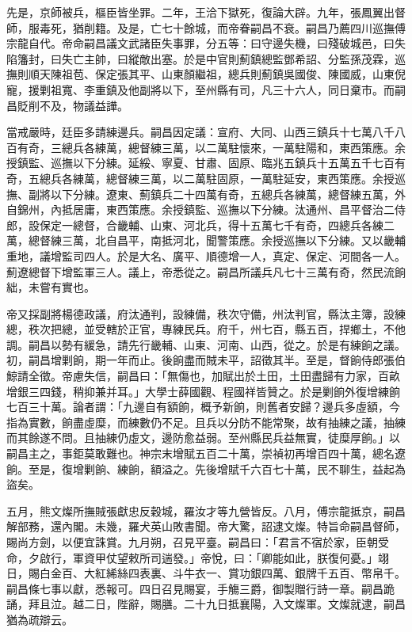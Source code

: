 \begin{pinyinscope}
先是，京師被兵，樞臣皆坐罪。二年，王洽下獄死，復論大辟。九年，張鳳翼出督師，服毒死，猶削籍。及是，亡七十餘城，而帝眷嗣昌不衰。嗣昌乃薦四川巡撫傅宗龍自代。帝命嗣昌議文武諸臣失事罪，分五等：曰守邊失機，曰殘破城邑，曰失陷籓封，曰失亡主帥，曰縱敵出塞。於是中官則薊鎮總監鄧希詔、分監孫茂霖，巡撫則順天陳祖苞、保定張其平、山東顏繼祖，總兵則薊鎮吳國俊、陳國威，山東倪寵，援剿祖寬、李重鎮及他副將以下，至州縣有司，凡三十六人，同日棄市。而嗣昌貶削不及，物議益譁。

當戒嚴時，廷臣多請練邊兵。嗣昌因定議：宣府、大同、山西三鎮兵十七萬八千八百有奇，三總兵各練萬，總督練三萬，以二萬駐懷來，一萬駐陽和，東西策應。余授鎮監、巡撫以下分練。延綏、寧夏、甘肅、固原、臨兆五鎮兵十五萬五千七百有奇，五總兵各練萬，總督練三萬，以二萬駐固原，一萬駐延安，東西策應。余授巡撫、副將以下分練。遼東、薊鎮兵二十四萬有奇，五總兵各練萬，總督練五萬，外自錦州，內抵居庸，東西策應。余授鎮監、巡撫以下分練。汰通州、昌平督治二侍郎，設保定一總督，合畿輔、山東、河北兵，得十五萬七千有奇，四總兵各練二萬，總督練三萬，北自昌平，南抵河北，聞警策應。余授巡撫以下分練。又以畿輔重地，議增監司四人。於是大名、廣平、順德增一人，真定、保定、河間各一人。薊遼總督下增監軍三人。議上，帝悉從之。嗣昌所議兵凡七十三萬有奇，然民流餉絀，未嘗有實也。

帝又採副將楊德政議，府汰通判，設練備，秩次守備，州汰判官，縣汰主簿，設練總，秩次把總，並受轄於正官，專練民兵。府千，州七百，縣五百，捍鄉土，不他調。嗣昌以勢有緩急，請先行畿輔、山東、河南、山西，從之。於是有練餉之議。初，嗣昌增剿餉，期一年而止。後餉盡而賊未平，詔徵其半。至是，督餉侍郎張伯鯨請全徵。帝慮失信，嗣昌曰：「無傷也，加賦出於土田，土田盡歸有力家，百畝增銀三四錢，稍抑兼并耳。」大學士薛國觀、程國祥皆贊之。於是剿餉外復增練餉七百三十萬。論者謂：「九邊自有額餉，概予新餉，則舊者安歸？邊兵多虛額，今指為實數，餉盡虛糜，而練數仍不足。且兵以分防不能常聚，故有抽練之議，抽練而其餘遂不問。且抽練仍虛文，邊防愈益弱。至州縣民兵益無實，徒糜厚餉。」以嗣昌主之，事鉅莫敢難也。神宗末增賦五百二十萬，崇禎初再增百四十萬，總名遼餉。至是，復增剿餉、練餉，額溢之。先後增賦千六百七十萬，民不聊生，益起為盜矣。

五月，熊文燦所撫賊張獻忠反穀城，羅汝才等九營皆反。八月，傅宗龍抵京，嗣昌解部務，還內閣。未幾，羅犬英山敗書聞。帝大驚，詔逮文燦。特旨命嗣昌督師，賜尚方劍，以便宜誅賞。九月朔，召見平臺。嗣昌曰：「君言不宿於家，臣朝受命，夕啟行，軍資甲仗望敕所司遄發。」帝悅，曰：「卿能如此，朕復何憂。」翊日，賜白金百、大紅絺絲四表裏、斗牛衣一、賞功銀四萬、銀牌千五百、幣帛千。嗣昌條七事以獻，悉報可。四日召見賜宴，手觴三爵，御製贈行詩一章。嗣昌跪誦，拜且泣。越二日，陛辭，賜膳。二十九日抵襄陽，入文燦軍。文燦就逮，嗣昌猶為疏辯云。


\end{pinyinscope}
